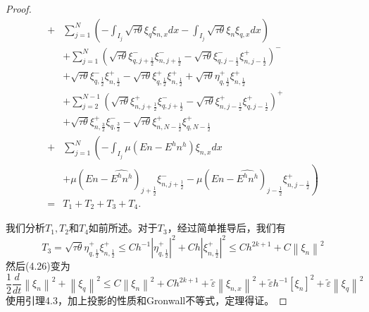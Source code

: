 \begin{proof}
\begin{equation}
\begin{aligned}
            + & \sum_{j=1}^{N}\left(-\int_{I_{j}} \sqrt{\tau \theta} \xi_{q} \xi_{n, x} d x-\int_{I_{j}} \sqrt{\tau \theta} \xi_{n} \xi_{q, x} d x\right)                                                                        \\
              & +\sum_{j=1}^{N}\left(\sqrt{\tau \theta} \xi_{q, j+\frac{1}{2}}^{-} \xi_{n, j+\frac{1}{2}}^{-}-\sqrt{\tau \theta} \xi_{q, j-\frac{1}{2}}^{-} \xi_{n, j-\frac{1}{2}}^{+}\right)^{-}                                \\
              & +\sqrt{\tau \theta} \xi_{q, \frac{1}{2}}^{-} \xi_{n, \frac{1}{2}}^{+}-\sqrt{\tau \theta} \xi_{q, \frac{1}{2}}^{+} \xi_{n, \frac{1}{2}}^{+}+\sqrt{\tau \theta} \eta_{q, \frac{1}{2}}^{+} \xi_{n, \frac{1}{2}}^{+} \\
              & +\sum_{j=2}^{N-1}\left(\sqrt{\tau \theta} \xi_{n, j+\frac{1}{2}}^{+} \xi_{q, j+\frac{1}{2}}^{-}-\sqrt{\tau \theta} \xi_{n, j-\frac{1}{2}}^{+} \xi_{q, j-\frac{1}{2}}^{+}\right)^{+}                              \\
              & +\sqrt{\tau \theta} \xi_{n, \frac{3}{2}}^{+} \xi_{q, \frac{3}{2}}^{-}-\sqrt{\tau \theta} \xi_{n, N-\frac{1}{2}}^{+} \xi_{q, N-\frac{1}{2}}^{+}                                                                   \\
            + & \sum_{j=1}^{N}\left(-\int_{I_{j}} \mu\left(E n-E^{h} n^{h}\right) \xi_{n, x} d x\right.                                                                                                                          \\
              & \left.+\mu\left(E n-\widehat{E^{h} n^{h}}\right)_{j+\frac{1}{2}} \xi_{n, j+\frac{1}{2}}^{-}-\mu\left(E n-\widehat{E^{h} n^{h}}\right)_{j-\frac{1}{2}} \xi_{n, j-\frac{1}{2}}^{+}\right)                          \\
            = & T_{1}+T_{2}+T_{3}+T_{4} .
        \end{aligned}
    \end{equation}


    我们分析$T_{1}, T_{2}$和$T_{4}$如前所述。对于$T_{3}$，经过简单推导后，我们有
    \begin{equation}
        T_{3}=\sqrt{\tau \theta} \eta_{q, \frac{1}{2}}^{+} \xi_{n, \frac{1}{2}}^{+} \leq C h^{-1}\left|\eta_{q, \frac{1}{2}}^{+}\right|^{2}+C h\left|\xi_{n, \frac{1}{2}}^{+}\right|^{2} \leq C h^{2 k+1}+C\left\|\xi_{n}\right\|^{2}
    \end{equation}
    然后(4.26)变为
    \begin{equation}
        \frac{1}{2} \frac{d}{d t}\left\|\xi_{n}\right\|^{2}+\left\|\xi_{q}\right\|^{2} \leq C\left\|\xi_{n}\right\|^{2}+C h^{2 k+1}+\tilde{\varepsilon}\left\|\xi_{n, x}\right\|^{2}+\tilde{\varepsilon} h^{-1}\left[\xi_{n}\right]^{2}+\tilde{\varepsilon}\left\|\xi_{q}\right\|^{2}
    \end{equation}
    使用引理4.3，加上投影的性质和Gronwall不等式，定理得证。
\end{proof}

